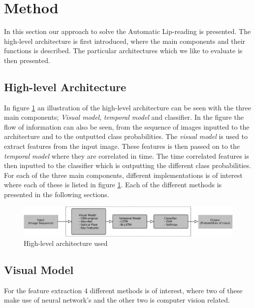 \section{Method}
\label{sec:method}

In this section our approach to solve the Automatic Lip-reading is presented.
The high-level architecture is first introduced, where the main components and their functions is described.
The particular architectures which we like to evaluate is then presented.

\subsection{High-level Architecture}
In figure \ref{fig:highLevelArchitecture} an illustration of the high-level architecture can be seen with the three main components; \textit{Visual model}, \textit{temporal model} and classifier.
In the figure the flow of information can also be seen, from the sequence of images inputted to the architecture and to the outputted class probabilities. 
The \textit{visual model} is used to extract features from the input image.
These features is then passed on to the \textit{temporal model} where they are correlated in time.
The time correlated features is then inputted to the classifier which is outputting the different class probabilities.
For each of the three main components, different implementations is of interest where each of these is listed in figure \ref{fig:highLevelArchitecture}. 
Each of the different methods is presented in the following sections.
\begin{figure}[h]
    \centering
    \includegraphics[width=\columnwidth]{fig/highLevelArchitecture.pdf}
    \caption{High-level architecture used}
    \label{fig:highLevelArchitecture}
\end{figure}

\subsection{Visual Model}
For the feature extraction 4 different methods is of interest, where two of these make use of neural network's and the other two is computer vision related.
